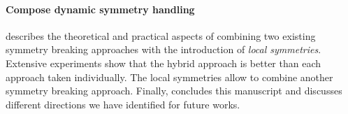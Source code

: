 \paragraph{Compose dynamic symmetry handling}
 describes the theoretical and practical aspects of combining two existing
symmetry  breaking approaches with the introduction of \textit{local symmetries}.
 Extensive experiments show that the hybrid approach is better than 
each approach taken individually. The local symmetries allow to combine another 
symmetry breaking approach.
Finally,  concludes this manuscript and discusses different directions we have identified for future works.
 

